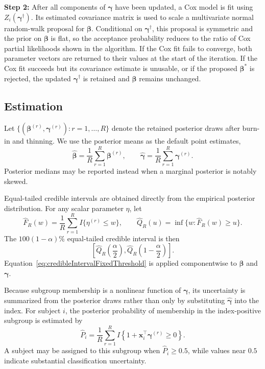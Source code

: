 \textbf{Step 2:}
After all components of $\boldsymbol\gamma$ have been updated, a Cox model is
fit using $Z_i(\boldsymbol\gamma^\dagger)$. Its estimated covariance matrix is
used to scale a multivariate normal random-walk proposal for
$\boldsymbol\beta$. Conditional on $\boldsymbol\gamma^\dagger$, this proposal
is symmetric and the prior on $\boldsymbol\beta$ is flat, so the acceptance
probability reduces to the ratio of Cox partial likelihoods shown in the
algorithm. If the Cox fit fails to converge, both parameter vectors are
returned to their values at the start of the iteration. If the Cox fit
succeeds but its covariance estimate is unusable, or if the proposed
$\boldsymbol\beta^*$ is rejected, the updated
$\boldsymbol\gamma^\dagger$ is retained and $\boldsymbol\beta$ remains
unchanged.

\subsection{Estimation}

Let
$\{(\boldsymbol\beta^{(r)},\boldsymbol\gamma^{(r)}):r=1,\ldots,R\}$
denote the retained posterior draws after burn-in and thinning. We use the
posterior means as the default point estimates,
\begin{equation}
\label{eq:posteriorMeanEstimates}
    \widehat{\boldsymbol\beta}
    =
    \frac{1}{R}\sum_{r=1}^{R}\boldsymbol\beta^{(r)},
    \qquad
    \widehat{\boldsymbol\gamma}
    =
    \frac{1}{R}\sum_{r=1}^{R}\boldsymbol\gamma^{(r)}.
\end{equation}
Posterior medians may be reported instead when a marginal posterior is notably
skewed.

Equal-tailed credible intervals are obtained directly from the empirical
posterior distribution. For any scalar parameter $\eta$, let
\[
    \widehat F_R(w)
    =
    \frac{1}{R}\sum_{r=1}^{R}I\{\eta^{(r)}\leq w\},
    \qquad
    \widehat Q_R(u)
    =
    \inf\{w:\widehat F_R(w)\geq u\}.
\]
The $100(1-\alpha)\%$ equal-tailed credible interval is then
\begin{equation}
\label{eq:credibleIntervalFixedThreshold}
    \left[
        \widehat Q_R\left(\frac{\alpha}{2}\right),
        \widehat Q_R\left(1-\frac{\alpha}{2}\right)
    \right].
\end{equation}
Equation~\ref{eq:credibleIntervalFixedThreshold} is applied componentwise to
$\boldsymbol\beta$ and $\boldsymbol\gamma$.

Because subgroup membership is a nonlinear function of
$\boldsymbol\gamma$, its uncertainty is summarized from the posterior draws
rather than only by substituting $\widehat{\boldsymbol\gamma}$ into the index.
For subject $i$, the posterior probability of membership in the
index-positive subgroup is estimated by
\begin{equation}
\label{eq:posteriorSubgroupProbability}
    \widehat P_i
    =
    \frac{1}{R}\sum_{r=1}^{R}
    I\left\{1+\mathbf{x}_i^\top\boldsymbol\gamma^{(r)}\geq 0\right\}.
\end{equation}
A subject may be assigned to this subgroup when
$\widehat P_i\geq 0.5$, while values near $0.5$ indicate substantial
classification uncertainty.


